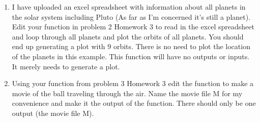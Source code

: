 \begin{enumerate}
\item I have uploaded an excel spreadsheet with information about all
planets in the solar system including Pluto (As far as I'm
concerned it's still a planet). Edit your function in problem 2
Homework 3 to read in the excel spreadsheet and loop through all
planets and plot the orbits of all planets. You should end up
generating a plot with 9 orbits. There is no need to plot the location
of the planets in this example. This function will have no outputs or
inputs. It merely needs to generate a plot.
\ \\

\item Using your function from problem 3 Homework 3 edit the function to
make a movie of the ball traveling through the air. Name the movie
file M for my convenience and make it the output of the
function. There should only be one output (the movie file M).
\ \\

\end{enumerate}
